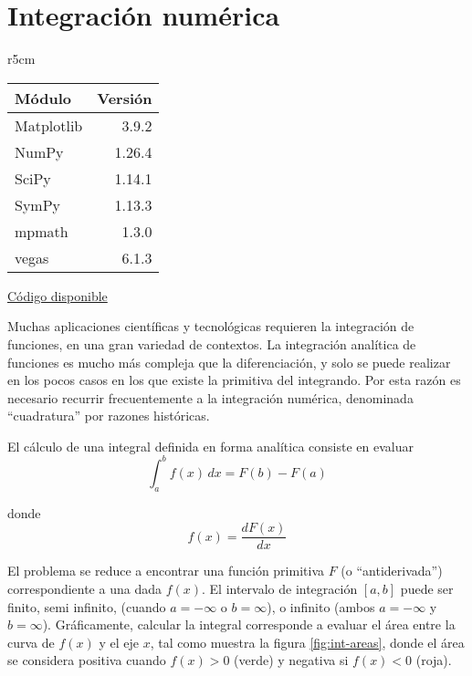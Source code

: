 

\chapter{Integración numérica} \label{ch:integracion}   

\begin{wraptable}{r}{5cm}
\begin{modulesinfo}
\begin{center}
{\small
    \begin{tabular}{l r}
        \toprule
        \textbf{Módulo} & \textbf{Versión} \\
        \midrule
        Matplotlib & 3.9.2 \\
        NumPy & 1.26.4 \\
        SciPy & 1.14.1 \\
        SymPy & 1.13.3 \\
        mpmath & 1.3.0 \\
        vegas & 6.1.3 \\
        \bottomrule
    \end{tabular}
    \vspace{0.75em}
    
    \href{https://github.com/facundobatista/libro-pyciencia/tree/master/código/integracion/}{Código disponible}
}
\end{center}
\end{modulesinfo}
\end{wraptable}
 
Muchas aplicaciones científicas y tecnológicas requieren la integración de funciones, en una gran variedad de contextos. La integración analítica de funciones es mucho más compleja que la diferenciación, y solo se puede realizar en los pocos casos en los que existe la primitiva del integrando. Por esta razón es necesario recurrir frecuentemente a la integración numérica, denominada ``cuadratura'' por razones históricas.

El cálculo de una integral definida en forma analítica consiste en evaluar
\[ \int_a^b f(x) \, dx = F(b) - F(a)\]

donde 
\[ f(x) = \frac{dF(x)}{dx} \]

El problema se reduce a encontrar una función primitiva $F$ (o ``antiderivada'') correspondiente a una dada $f(x)$. El intervalo de integración $[a, b]$ puede ser finito, semi infinito, (cuando $a = -\infty$ o $b = \infty$), o infinito (ambos $a = -\infty$ y $b = \infty$). Gráficamente, calcular la integral corresponde a evaluar el área entre la curva de $f(x)$ y el eje $x$, tal como muestra la figura \ref{fig:int-areas}, donde el área se considera positiva cuando $f(x) > 0$ (verde) y negativa si $f(x) < 0$ (roja).

